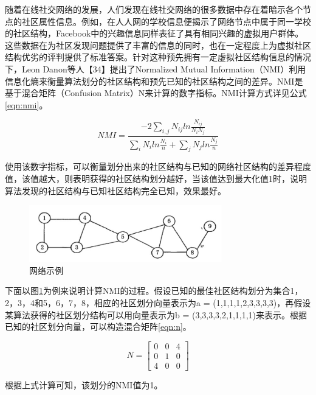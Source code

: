随着在线社交网络的发展，人们发现在线社交网络的很多数据中存在着暗示各个节点的社区属性信息。例如，在人人网的学校信息便揭示了网络节点中属于同一学校的社区结构，Facebook中的兴趣信息同样表征了具有相同兴趣的虚拟用户群体。这些数据在为社区发现问题提供了丰富的信息的同时，也在一定程度上为虚拟社区结构优劣的评判提供了标准答案。针对这种预先拥有一定虚拟社区结构信息的情况下，Leon Danon等人【34】提出了Normalized Mutual Information（NMI）利用信息化熵来衡量算法划分的社区结构和预先已知的社区结构之间的差异。NMI是基于混合矩阵（Confusion Matrix）N来计算的数字指标。NMI计算方式详见公式\ref{eqn:nmi}。

\begin{equation}
  \label{eqn:nmi}
  NMI=\frac{ -2 \sum_{i,j} N_{ij}  ln{\frac{N_{ij}}{N_iN_j}} } {\sum_{i}N_iln{\frac{N_i}{n}}+\sum_{j}N_jln{\frac{N_j}{n}}}
\end{equation}

使用该数字指标，可以衡量划分出来的社区结构与已知的网络社区结构的差异程度值，该值越大，则表明获得的社区结构划分越好，当该值达到最大化值1时，说明算法发现的社区结构与已知社区结构完全已知，效果最好。

\begin{figure}
  \centering
  \includegraphics[width=0.75\textwidth]{figures/fig2-2}
  \caption{网络示例}\label{fig:fig2-2}
\end{figure}

下面以图\ref{fig:fig2-2}为例来说明计算NMI的过程。假设已知的最佳社区结构划分为集合{1，2，3，4}和{5，6，7，8}，相应的社区划分向量表示为a = (1,1,1,1,2,3,3,3,3)，再假设某算法获得的社区划分结构可以用向量表示为b = (3,3,3,3,2,1,1,1,1)来表示。根据已知的社区划分向量，可以构造混合矩阵\ref{eqn:n}。

\begin{equation}
  \label{eqn:n}
  N=\begin{bmatrix}
    0 & 0 &4 \\ 
    0 & 1 & 0\\ 
    4 & 0 & 0
    \end{bmatrix}
\end{equation}

根据上式计算可知，该划分的NMI值为1。
